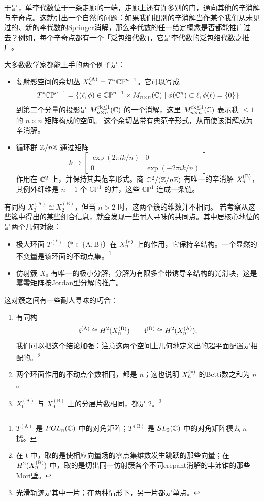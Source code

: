 于是，单李代数位于一条走廊的一端，走廊上还有许多别的门，通向其他的辛消解与辛奇点。这就引出一个自然的问题：如果我们把别的辛消解当作某个我们从未见过的、新的李代数的Springer消解，那么李代数的任一给定概念是否都能推广过去？例如，每个辛奇点都有一个「泛包络代数」，它是李代数的泛包络代数之推广。

大多数数学家都能上手的两个例子是：
\begin{itemize}
    \item 复射影空间的余切丛 $X_n^{(\mathrm{A})}=T^*\mathbb{CP}^{n-1}$。它可以写成
    \begin{equation*}
    T^*\mathbb{CP}^{n-1} =\{(\ell, \phi)\in \mathbb{CP}^{n-1}\times M_{n\times n}(\mathbb{C}) \mid \phi(\mathbb{C}^n)\subset \ell, \phi(\ell)=\{0\}\}
    \end{equation*}
    到第二个分量的投影是 $M_{n\times n}^{\mathrm{rk}\leq 1}(\mathbb{C})$ 的一个消解，这里 $M_{n\times n}^{\mathrm{rk}\leq 1}(\mathbb{C})$ 表示秩 $\leq 1$ 的 $n\times n$ 矩阵构成的空间。
    这个余切丛带有典范辛形式，从而使该消解成为辛消解。
    \item 循环群 $\mathbb{Z}/n\mathbb{Z}$ 通过矩阵
    \[k\mapsto \begin{bmatrix} \exp(2\pi ik/n) & 0\\0& \exp(-2\pi ik/n)\end{bmatrix}
    \]
    作用在 $\mathbb{C}^2$ 上，并保持其典范辛形式。商 $\mathbb{C}^2/(\mathbb{Z}/n\mathbb{Z})$ 有唯一的辛消解 $X_n^{(\mathrm{B})}$，其例外纤维是 $n-1$ 个 $\mathbb{CP}^1$ 的并，这些 $\mathbb{CP}^1$ 连成一条链。
\end{itemize}
有同构 $X_2^{(\mathrm{A})}\cong X_2^{(\mathrm{B})}$，但当 $n>2$ 时，这两个簇的维数并不相同。
若考察从这些簇中得出的某些组合信息，就会发现一些耐人寻味的共同点。其中居核心地位的是两个几何对象：
\begin{itemize}
    \item 极大环面 $T^{(*)}$（$*\in \{\mathrm{A},\mathrm{B}\}$）在 $X_n^{(*)}$ 上的作用，它保持辛结构。一个显然的不变量是该环面的不动点集。\footnote{$T^{(\mathrm{A})}$ 是 $PGL_n(\mathbb{C})$ 中的对角矩阵；$T^{(\mathrm{B})}$ 是 $SL_2(\mathbb{C})$ 中的对角矩阵模去 $n$ 挠。}
    \item 仿射簇 $X_0$ 有唯一的极小分解，分解为有限多个带诱导辛结构的光滑块，这是幂零矩阵按Jordan型分解的推广。
\end{itemize}
这对簇之间有一些耐人寻味的巧合：
\begin{enumerate}
    \item 有同构
    \[\mathfrak{t}^{(\mathrm{A})}\cong H^2(X_n^{(\mathrm{B})})\qquad \mathfrak{t}^{(\mathrm{B})}\cong H^2(X_n^{(\mathrm{A})}).\]
    我们可以把这个结论加强：注意这两个空间上几何地定义出的超平面配置是相配的。\footnote{在 $\mathfrak{t}$ 中，取的是使相应向量场的零点集维数发生跳跃的那些向量；在 $H^2(X_n^{(\mathrm{B})})$ 中，取的是切出同一仿射簇各个不同crepant消解的丰沛锥的那些Mori壁。}
    \item 两个环面作用的不动点个数相同，都是 $n$；这也说明 $X_n^{(*)}$ 的Betti数之和为 $n$。
    \item $X_0^{(\mathrm{A})}$ 与 $X_0^{(\mathrm{B})}$ 上的分层片数相同，都是 $2$。\footnote{光滑轨迹是其中一片；在两种情形下，另一片都是单点。}
\end{enumerate}
